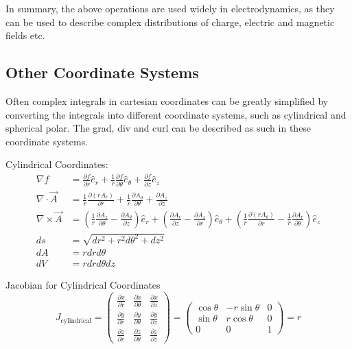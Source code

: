 \documentclass{book}
\begin{document}
In summary, the above operations are used widely in electrodynamics, as they can be used to describe complex distributions of charge, electric and magnetic fields etc.


\subsection{Other Coordinate Systems}

Often complex integrals in cartesian coordinates can be greatly simplified by converting the integrals into different coordinate systems, such as cylindrical and spherical polar. The grad, div and curl can be described as such in these coordinate systems.

Cylindrical Coordinates:
\begin{align*}
	\nabla f &= \frac{\partial f}{\partial r} \hat{e}_r + \frac{1}{r} \frac{\partial f}{\partial \theta} \hat{e}_\theta + \frac{\partial f}{\partial z} \hat{e}_z \\
	\nabla \cdot \vec{A} &= \frac{1}{r} \frac{\partial (r A_r)}{\partial r} + \frac{1}{r} \frac{\partial A_\theta}{\partial \theta} + \frac{\partial A_z}{\partial z} \\
	\nabla \times \vec{A} &= \left( \frac{1}{r} \frac{\partial A_z}{\partial \theta} - \frac{\partial A_\theta}{\partial z} \right) \hat{e}_r + \left( \frac{\partial A_r}{\partial z} - \frac{\partial A_z}{\partial r} \right) \hat{e}_\theta + \left( \frac{1}{r} \frac{\partial (r A_\theta)}{\partial r} - \frac{1}{r} \frac{\partial A_r}{\partial \theta} \right) \hat{e}_z \\
	ds &= \sqrt{dr^2 + r^2d\theta^2 + dz^2} \\
	dA &= r dr d\theta \\
	dV &= r dr d\theta dz
\end{align*}

Jacobian for Cylindrical Coordinates
\begin{equation*}
	J_{\text{cylindrical}} = \begin{pmatrix}
		\frac{\partial x}{\partial r} & \frac{\partial x}{\partial \theta} & \frac{\partial x}{\partial z} \\
		\frac{\partial y}{\partial r} & \frac{\partial y}{\partial \theta} & \frac{\partial y}{\partial z} \\
		\frac{\partial z}{\partial r} & \frac{\partial z}{\partial \theta} & \frac{\partial z}{\partial z}
	\end{pmatrix}
	= \begin{pmatrix}
		\cos \theta & -r \sin \theta & 0 \\
		\sin \theta & r \cos \theta & 0 \\
		0 & 0 & 1
	\end{pmatrix} = r
\end{equation*}
\end{document}
